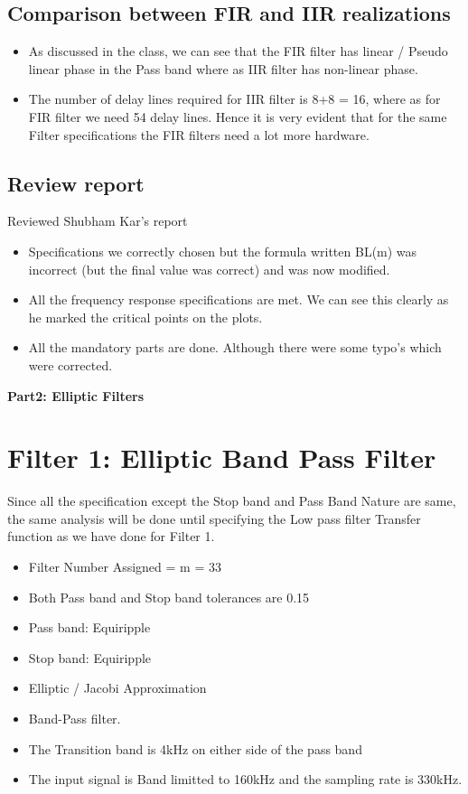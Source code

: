 \documentclass[12pt]{article}
\begin{document}
\color{cyan}
\subsection{Comparison between FIR and IIR realizations}
\color{black}
\begin{itemize}
	\item As discussed in the class, we can see that the FIR filter has linear / Pseudo linear phase in the Pass band where as IIR filter has non-linear phase.
	\item The number of delay lines required for IIR filter is 8+8 = 16, where as for FIR filter we need 54 delay lines.  Hence it is very evident that for the same Filter specifications the FIR filters need a lot more hardware. 
\end{itemize}

\color{cyan}
\subsection{Review report}
\color{black}
Reviewed Shubham Kar's report
\begin{itemize}
	\item Specifications we correctly chosen but the formula written BL(m) was incorrect (but the final value was correct) and was now modified.
	\item All the frequency response specifications are met. We can see this clearly as he marked the critical points on the plots.
	\item All the mandatory parts are done. Although there were some typo's which were corrected.
\end{itemize}
\newpage

\color{darkblue}
\noindent\textbf{\Large{Part2: Elliptic Filters}}
\section{Filter 1: Elliptic Band Pass Filter}
\color{black}
Since all the specification except the Stop band and Pass Band Nature are same, the same analysis will be done until specifying the Low pass filter Transfer function as we have done for Filter 1. \begin{itemize}
	\item Filter Number Assigned = m = 33
	\item Both Pass band and Stop band tolerances are 0.15
	\item Pass band: Equiripple 
	\item Stop band: Equiripple
	\item Elliptic / Jacobi Approximation
	\item Band-Pass filter.
	\item The Transition band is 4kHz on either side of the pass band
	\item The input signal is Band limitted to 160kHz and the sampling rate is 330kHz.
\end{itemize}
\color{cyan}
\end{document}
